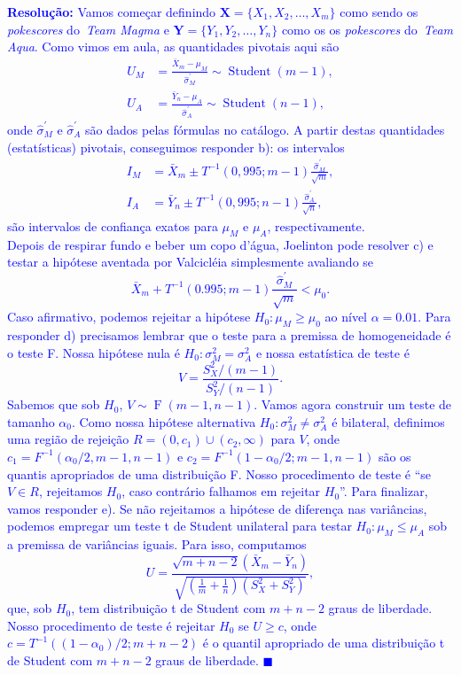 \documentclass[a4paper,10pt, notitlepage]{report}
\newcommand{\bX}{\boldsymbol{X}} %
\begin{document}
\textcolor{blue}{
\textbf{Resolução:}
Vamos começar definindo $\bX = \{X_1, X_2, \ldots, X_m\}$ como sendo os \textit{pokescores} do~\textit{Team Magma} e $\boldsymbol{Y} = \{Y_1, Y_2, \ldots, Y_n\}$ como os os \textit{pokescores} do~\textit{Team Aqua}.
Como vimos em aula, as quantidades pivotais aqui são
\begin{align*}
 U_M &= \frac{\bar{X}_m - \mu_M}{\hat{\sigma}_M^\prime} \sim \operatorname{Student}(m-1),\\
 U_A &= \frac{\bar{Y}_n - \mu_A}{\hat{\sigma}_A^\prime} \sim \operatorname{Student}(n-1),
\end{align*}
onde $\hat{\sigma}_M^\prime$ e $\hat{\sigma}_A^\prime$ são dados pelas fórmulas no catálogo.
A partir destas quantidades (estatísticas) pivotais, conseguimos responder b): os intervalos
\begin{align*}
 I_M & = \bar{X}_m \pm T^{-1}(0,995; m- 1)\frac{\hat{\sigma}_M^\prime}{\sqrt{m}},\\
 I_A & = \bar{Y}_n \pm T^{-1}(0,995; n- 1)\frac{\hat{\sigma}_A^\prime}{\sqrt{n}},
\end{align*}
são intervalos de confiança exatos para $\mu_M$ e $\mu_A$, respectivamente.\\
Depois de respirar fundo e beber um copo d'água, Joelinton pode resolver c) e testar a hipótese aventada por Valcicléia simplesmente avaliando se 
$$ \bar{X}_m + T^{-1}(0.995; m- 1)\frac{\hat{\sigma}_M^\prime}{\sqrt{m}} < \mu_0.$$
Caso afirmativo, podemos rejeitar a hipótese $H_0: \mu_M \geq \mu_0$ ao nível $\alpha = 0.01$.
Para responder d) precisamos lembrar que o teste para a premissa de homogeneidade é o teste F.
Nossa hipótese nula é $H_0: \sigma^2_M = \sigma^2_A$ e nossa estatística de teste é 
$$  V = \frac{S_X^2/(m-1)}{S_Y^2/(n-1)}. $$
Sabemos que sob $H_0$, $V \sim\operatorname{F}(m-1, n-1)$.
Vamos agora construir um teste de tamanho $\alpha_0$.
Como nossa hipótese alternativa $H_0: \sigma^2_M \neq \sigma^2_A$ é bilateral, definimos uma região de rejeição $R = (0, c_1) \cup (c_2, \infty)$ para $V$, onde $c_1 = F^{-1}(\alpha_0/2, m-1, n-1)$ e $c_2 = F^{-1}(1-\alpha_0/2; m-1, n-1)$ são os quantis apropriados de uma distribuição F. 
Nosso procedimento de teste é ``se $V \in R$, rejeitamos $H_0$, caso contrário falhamos em rejeitar $H_0$''.
Para finalizar, vamos responder e).
Se não rejeitamos a hipótese de diferença nas variâncias, podemos empregar um teste t de Student unilateral para testar $H_0: \mu_M \leq \mu_A$ sob a premissa de variâncias iguais.
Para isso, computamos
$$ U = \frac{\sqrt{m + n - 2}(\bar{X}_m - \bar{Y}_n)}{\sqrt{\left(\frac{1}{m} + \frac{1}{n}\right) (S_X^2 + S_Y^2)}},$$
que, sob $H_0$, tem distribuição t de Student com $m + n-2$ graus de liberdade.
Nosso procedimento de teste é rejeitar $H_0$ se $U \geq c$, onde $c = T^{-1}( (1-\alpha_0)/2; m + n -2)$ é o quantil apropriado de uma distribuição t de Student com $m + n -2$ graus de liberdade.
$\blacksquare$
}
\end{document}
